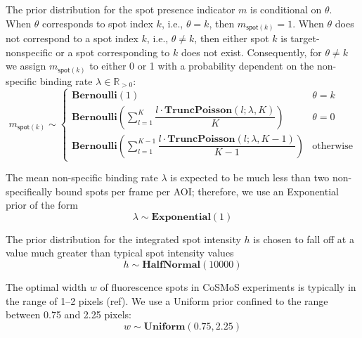 The prior distribution for the spot presence indicator $m$ is conditional on $\theta$. When $\theta$ corresponds to spot index $k$, i.e., $\theta = k$, then $m_{\mathsf{spot}(k)} = 1$. When $\theta$ does not correspond to a spot index $k$, i.e., $\theta \neq k$, then either spot $k$ is target-nonspecific or a spot corresponding to $k$ does not exist. Consequently, for $\theta \neq k$ we assign $m_{\mathsf{spot}(k)}$ to either 0 or 1 with a probability dependent on the non-specific binding rate $\lambda \in \mathbb{R}_{>0}$:
%
\begin{equation}
    m_{\mathsf{spot}(k)} \sim
    \begin{cases}
        \mathbf{Bernoulli}(1) & \text{$\theta = k$} \\
        \mathbf{Bernoulli} \left( \sum_{l=1}^K \dfrac{l \cdot \mathbf{TruncPoisson}(l; \lambda, K)}{K} \right) & \text{$\theta = 0$} \\
        \mathbf{Bernoulli} \left( \sum_{l=1}^{K-1} \dfrac{l \cdot \mathbf{TruncPoisson}(l; \lambda, K-1)}{K-1} \right) & \text{otherwise}
    \end{cases}
\end{equation}

The mean non-specific binding rate $\lambda$ is expected to be much less than two non-specifically bound spots per frame per AOI; therefore, we use an Exponential prior of the form
%
\begin{equation}
    \lambda \sim \mathbf{Exponential}(1)
\end{equation}

The prior distribution for the integrated spot intensity $h$ is chosen to fall off at a value much greater than typical spot intensity values 
%
\begin{equation}
    h \sim \mathbf{HalfNormal}(10000)
\end{equation}

The optimal width $w$ of fluorescence spots in CoSMoS experiments is typically in the range of 1--2 pixels (ref). We use a Uniform prior confined to the range between 0.75 and 2.25 pixels:
%
\begin{equation}
    w \sim \mathbf{Uniform}(0.75, 2.25)
\end{equation}

